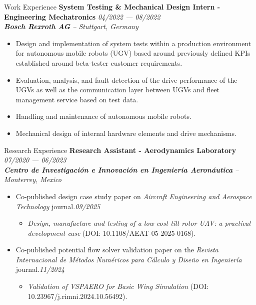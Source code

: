\documentclass[a4paper]{resume} %
\begin{document}
\begin{rSection}{Work Experience}
        {\bf System Testing \& Mechanical Design Intern - Engineering Mechatronics} \hfill{\itshape 04/2022 --- 08/2022} 
        \\{\textit{\textbf{Bosch Rexroth AG} -- Stuttgart, Germany}}
        \begin{itemize}
            \item Design and implementation of system tests within a production environment for autonomous mobile robots (UGV) based around previously defined KPIs established around beta-tester customer requirements.
            \item Evaluation, analysis, and fault detection of the drive performance of the UGVs as well as the communication layer between UGVs and fleet management service based on test data.
            \item Handling and maintenance of autonomous mobile robots.
            \item Mechanical design of internal hardware elements and drive mechanisms.
        \end{itemize}
    \end{rSection}

    
    \begin{rSection}{Research Experience}
        {\bf Research Assistant - Aerodynamics Laboratory} \hfill {\itshape 07/2020 --- 06/2023} 
        \\{\textit{\textbf{Centro de Investigación e Innovación en Ingeniería Aeronáutica} -- Monterrey, Mexico}}
        \vspace{-0.5em}
        \begin{itemize}
            \item Co-published design case study paper on \textit{Aircraft Engineering and Aerospace Technology} journal.\hfill {\itshape 09/2025}
            \begin{itemize}
                \item \textit{Design, manufacture and testing of a low-cost tilt-rotor UAV: a practical development case} (DOI: 10.1108/AEAT-05-2025-0168). 
            \end{itemize}
            
            \item Co-published potential flow solver validation paper on the \textit{Revista Internacional de Métodos Numéricos para Cálculo y Diseño en Ingeniería} journal.\hfill {\itshape 11/2024}
            \begin{itemize}
            	\item \textit{Validation of VSPAERO for Basic Wing Simulation} (DOI: 10.23967/j.rimni.2024.10.56492). 
            \end{itemize}            
        \end{itemize}
    \end{rSection}
    
\end{document}
